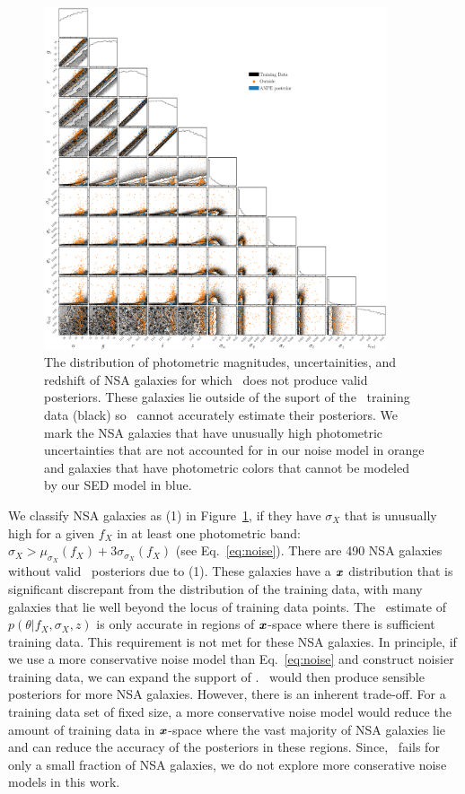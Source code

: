 \begin{figure}
\begin{center}
    \includegraphics[width=0.9\textwidth]{figs/fails.pdf}
    \caption{\label{fig:fail}
    The distribution of photometric magnitudes, uncertainities, and redshift of
    NSA galaxies for which \sedflow~does not produce valid posteriors. 
    These galaxies lie outside of the suport of the \sedflow~training data
    (black) so \sedflow~cannot accurately estimate their posteriors. 
    We mark the NSA galaxies that have unusually high photometric uncertainties
    that are not accounted for in our noise model in orange and galaxies that
    have photometric colors that cannot be modeled by our SED model in blue. 
    }
\end{center}
\end{figure}
We classify NSA galaxies as (1) in Figure~\ref{fig:fail}, if they have
$\sigma_X$ that is unusually high for a given $f_X$ in at least one photometric
band: $\sigma_X > \mu_{\sigma_X}(f_X) + 3 \sigma_{\sigma_X}(f_X)$
(see Eq.~\ref{eq:noise}). 
There are 490 NSA galaxies without valid \sedflow~posteriors due to (1).
These galaxies have a $\textbf{\textit{x}}$ distribution that is significant discrepant
from the distribution of the training data, with many galaxies that lie well
beyond the locus of training data points. 
The \sedflow~estimate of $p(\theta | f_X, \sigma_X, z)$ is only accurate in
regions of $\textbf{\textit{x}}$-space where there is sufficient training data. 
This requirement is not met for these NSA galaxies.  
In principle, if we use a more conservative noise model than Eq.~\ref{eq:noise}
and construct noisier training data, we can expand the support of \sedflow. 
\sedflow~would then produce sensible posteriors for more NSA galaxies. 
However, there is an inherent trade-off. 
For a training data set of fixed size, a more conservative noise model would
reduce the amount of training data in $\textbf{\textit{x}}$-space where the vast majority
of NSA galaxies lie and can reduce the accuracy of the posteriors in these
regions. 
Since, \sedflow~fails for only a small fraction of NSA galaxies, we do not
explore more conserative noise models in this work.

